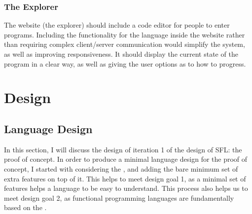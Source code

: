 \subsubsection{The Explorer}
The website (the explorer) should include a code editor for people to enter programs. Including the functionality for the language inside the website rather than requiring complex client/server communication would simplify the system, as well as improving responsiveness. It should display the current state of the program in a clear way, as well as giving the user options as to how to progress. 

\section{Design}



\subsection{Language Design}
In this section, I will discuss the design of iteration 1 of the design of \ac{SFL}: the proof of concept. In order to produce a minimal language design for the proof of concept, I started with considering the \lcalc, and adding the bare minimum set of extra features on top of it. This helps to meet design goal 1, as a minimal set of features helps a language to be easy to understand. This process also helps us to meet design goal 2, as functional programming languages are fundamentally based on the \lcalc.

